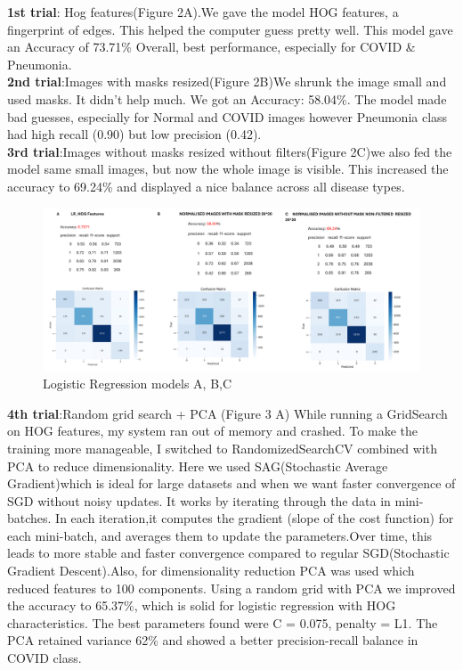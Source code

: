 \documentclass{article}
\begin{document}
\textbf{1st trial}: Hog features(Figure 2A).We gave the model HOG features, a fingerprint of edges. This helped the computer guess pretty well.
This model gave an Accuracy of 73.71\%
Overall, best performance, especially for COVID \& Pneumonia.
\\
\textbf{2nd trial}:Images with masks resized(Figure 2B)We shrunk the image small and used masks. It didn’t help much.
We got an Accuracy: 58.04\%. The model made bad guesses, especially for Normal and COVID images however Pneumonia class had high recall (0.90) but low precision (0.42).
\\
\textbf{3rd trial}:Images without masks resized without filters(Figure 2C)we also fed the model same small images, but now the whole image is visible. This increased the accuracy to 69.24\%  and displayed a nice balance across all disease types.
\\
\begin{figure}[ht] %
    \centering
    \includegraphics[width=1.0\linewidth]{lr1,2,3.png}
    \caption{Logistic Regression models A, B,C}
    \label{Logistic Regression}
\end{figure}
\textbf{4th trial}:Random grid search + PCA (Figure 3 A)
While running a GridSearch on HOG features, my system ran out of memory and crashed. To make the training more manageable, I switched to RandomizedSearchCV combined with PCA to reduce dimensionality.
Here we used SAG(Stochastic Average Gradient)which is ideal for large datasets and when we want faster convergence of SGD without noisy updates. It works by iterating through the data in mini-batches. In each iteration,it computes the gradient (slope of the cost function) for each mini-batch, and averages them to update the parameters.Over time, this leads to more stable and faster convergence compared to regular SGD(Stochastic Gradient Descent).Also, for dimensionality reduction PCA was used which reduced features to 100 components.
Using a random grid with PCA we improved the accuracy to 65.37\%, which is solid for logistic regression with HOG characteristics. The best parameters found were C = 0.075, penalty = L1. The PCA retained variance 62\% and showed a better precision-recall balance in COVID class.\\
\end{document}
